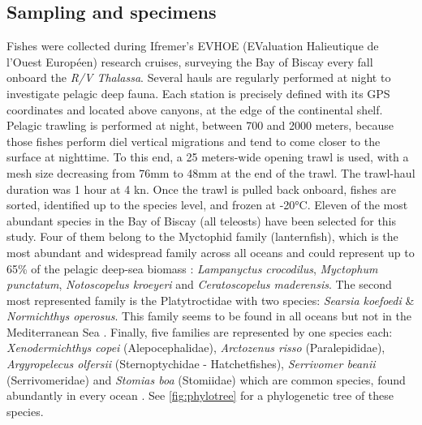 

\subsection{Sampling and specimens}

Fishes were collected during Ifremer's EVHOE (EValuation Halieutique de l'Ouest Européen) research cruises, surveying the Bay of Biscay every fall onboard the \textit{R/V Thalassa}. Several hauls are regularly performed at night to investigate pelagic deep fauna. Each station is precisely defined with its GPS coordinates and located above canyons, at the edge of the continental shelf. 
Pelagic trawling is performed at night, between 700 and 2000 meters, because those fishes perform diel vertical migrations and tend to come closer to the surface at nighttime. To this end, a 25 meters-wide opening trawl is used, with a mesh size decreasing from 76mm to 48mm at the end of the trawl. The trawl-haul duration was 1 hour at 4 kn. 
Once the trawl is pulled back onboard, fishes are sorted, identified up to the species level, and frozen at -20°C. Eleven of the most abundant species in the Bay of Biscay (all teleosts) have been selected for this study. Four of them belong to the Myctophid family (lanternfish), which is the most abundant and widespread family across all oceans \citep{debusserolles2014} and could represent up to 65\% of the pelagic deep-sea biomass \citep{poulsen2013}: \textit{Lampanyctus crocodilus}, \textit{Myctophum punctatum}, \textit{Notoscopelus kroeyeri} and \textit{Ceratoscopelus maderensis}. The second most represented family is the Platytroctidae with two species: \textit{Searsia koefoedi} \& \textit{Normichthys operosus}. This family seems to be found in all oceans but not in the Mediterranean Sea \citep{orrell2016}. Finally, five families are represented by one species each: \textit{Xenodermichthys copei} (Alepocephalidae), \textit{Arctozenus risso} (Paralepididae), \textit{Argyropelecus olfersii} (Sternoptychidae - Hatchetfishes), \textit{Serrivomer beanii} (Serrivomeridae) and \textit{Stomias boa} (Stomiidae) which are common species, found abundantly in every ocean \citep{carvalho1988,froese2019,geidner2008,germain2019}. See \ref{fig:phylotree} for a phylogenetic tree of these species. 



